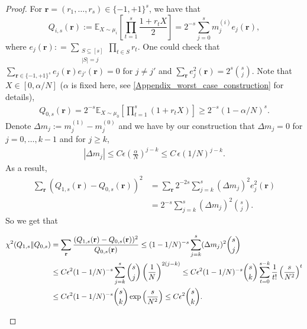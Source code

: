 \documentclass[aps,prx,reprint,superscriptaddress,amsmath,amssymb,longbibliography,floatfix]{revtex4-2}
\newcommand{\dsE}{\mathbb{E}}
\renewcommand{\vr}{\mathbf{r}}
\theoremstyle{plain}
\theoremstyle{definition}
\theoremstyle{remark}
\begin{document}
\begin{proof}
For $\vr = (r_1,\dots,r_s) \in \{-1,+1\}^s$, we have that
\begin{equation}Q_{i,s}(\vr) := \dsE_{X\sim \mu_i} \left[
\prod_{t=1}^s \frac{1 + r_t X}{2}  \right] = 2^{-s} \sum_{j=0} ^s m^{(i)}_j e_j(\vr), 
\label{eq:app-local-mmd-outcome-mixture}
\end{equation}
where 
$e_j(\vr) : = \sum_{ \substack{S\subseteq[s]\\|S| = j} } \prod_{t\in S} r_t$. One could check that $\sum_{ \vr\in\{-1,+1\}^s }e_j(\vr) e_{j'}(\vr) = 0$ for $j\neq j'$ and $\sum_{\vr} e_j^2(\vr) = 2^s \binom{s}{j}$. Note that $X\in [0, \alpha/N]$ ($\alpha$ is fixed here, see \ref{Appendix_worst_case_construction} for details),
\begin{align*}
    Q_{0,s}(\vr ) = 2^{-s} \dsE_{X\sim \mu_0} \left[ \prod_{t=1}^s (1 + r_t X) \right] \geq 2^{-s} (1-\alpha/N)^s.
\end{align*}
Denote $\Delta m_j := m_j^{(1)} - m_j^{(0)}$ and we have by our construction that $\Delta m_j=0$ for $j=0,\dots,k-1$ and for $j\geq k$,
\begin{align*}
    |\Delta m_j| \leq C\epsilon \left(\frac{\alpha}{N}\right)^{j-k} \leq C\, \epsilon (1/N)^{j-k}.
\end{align*}
As a result,
\begin{align*}
\sum_{ \vr } (Q_{1,s}( \vr) - Q_{0,s} (\vr) )^2 &= \sum_{ \vr } 2^{-2s} \sum_{j=k}^s (\Delta m_j)^2 e_j^2(\vr)\\
    &= 2^{-s} \sum_{j=k}^s (\Delta m_j)^2 \binom{s}{j}.
\end{align*}
So we get that  
\begin{widetext}
\begin{align}
    \chi^2 ( Q_{1,s} \| Q_{0,s} )  &= \sum_{\vr}\frac{(Q_{1,s}(\vr) - Q_{0,s}(\vr) )^2}{Q_{0,s}(\vr)} \leq (1 - 1/N)^{-s} \sum_{j=k}^s (\Delta m_j)^2 \binom{s}{j}\notag\\
    &\leq C \epsilon^2 (1 - 1/N)^{-s} \sum_{j=k}^s  \binom{s}{j} \left( \frac{1}{N} \right)^{2(j-k)} \leq C \epsilon^2 (1 - 1/N)^{-s} \binom{s}{k} \sum_{t=0}^{s-k} \frac{1}{t!}  \left( \frac{s}{N^2} \right)^{t}\notag\\
    &\leq C \epsilon^2 (1 - 1/N)^{-s} \binom{s}{k} \exp \left(\frac{ s}{N^2} \right) \leq C \epsilon^2  \binom{s}{k}.
\label{eq:app-local-mmd-chi-square-bound}
\end{align}

\end{widetext}
\end{proof}
\end{document}
